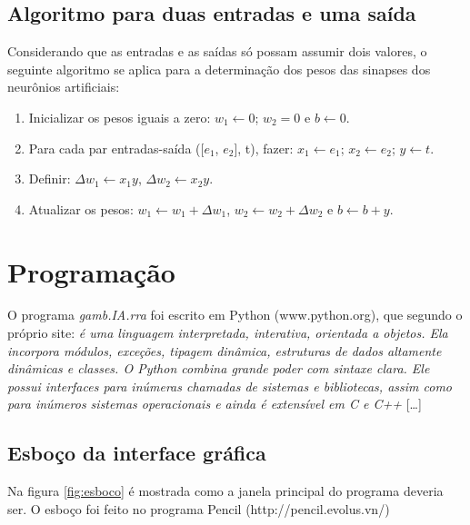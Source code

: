 \documentclass[11pt]{article}
\begin{document}
\subsection{Algoritmo para duas entradas e uma saída}\label{sec:algoritmo}

Considerando que as entradas e as saídas só possam assumir dois valores, o seguinte algoritmo se aplica para a determinação dos pesos das sinapses dos neurônios artificiais:

\begin{enumerate}
\item Inicializar os pesos iguais a zero: $w_1 \leftarrow 0$; $w_2 = 0$ e $b \leftarrow 0$.

\item Para cada par entradas-saída ([$e_1$, $e_2$], t), fazer: $x_1 \leftarrow e_1$; $x_2 \leftarrow e_2$; $y \leftarrow t$.

\item Definir: $\Delta w_1 \leftarrow x_1 y$, $\Delta w_2 \leftarrow x_2 y$.

\item Atualizar os pesos: $w_1 \leftarrow w_1 + \Delta w_1$, $w_2 \leftarrow w_2 + \Delta w_2$ e $b \leftarrow b + y$.
\end{enumerate}

\section{Programação}

O programa \emph{gamb.IA.rra} foi escrito em Python (www.python.org), que segundo o próprio site: \emph{ é uma linguagem interpretada, interativa, orientada a objetos. Ela incorpora módulos, exceções, tipagem dinâmica, estruturas de dados altamente dinâmicas e classes. O Python combina grande poder com sintaxe clara. Ele possui interfaces para inúmeras chamadas de sistemas e bibliotecas, assim como para inúmeros sistemas operacionais e ainda é extensível em C e C++} [\ldots]

\subsection{Esboço da interface gráfica}

Na figura \ref{fig:esboco} é mostrada como a janela principal do programa deveria ser. O esboço foi feito no programa Pencil (http://pencil.evolus.vn/)
\end{document}
